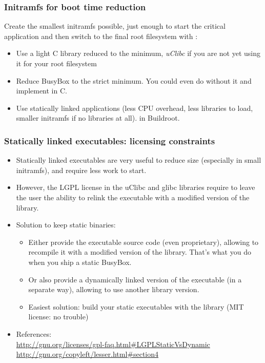 \begin{frame}
\frametitle{Initramfs for boot time reduction}
Create the smallest initramfs possible, just enough to start the critical
application and then switch to the final root filesystem with
:
\begin{itemize}
\item Use a light C library reduced to the minimum,
      {\em uClibc} if you are not yet using it for your root filesystem
\item Reduce BusyBox to the strict minimum.
      You could even do without it and implement  in C.
\item Use statically linked applications (less CPU overhead, less
      libraries to load, smaller initramfs if no libraries at all).
       in Buildroot.
\end{itemize}
\end{frame}

\begin{frame}
\frametitle{Statically linked executables: licensing constraints}
\begin{itemize}
\item Statically linked executables are very useful to reduce size
      (especially in small initramfs), and require less work to start.
\item However, the LGPL license in the uClibc and glibc libraries
      require to leave the user the ability to relink the executable
      with a modified version of the library.
\item Solution to keep static binaries:
      \begin{itemize}
      \item Either provide the executable source code (even
            proprietary), allowing to recompile it with a modified
            version of the library. That's what you do when
            you ship a static BusyBox.
      \item Or also provide a dynamically linked version of the
	    executable (in a separate way), allowing to use another
            library version.
      \item Easiest solution: build your static executables with the
	     library (MIT license: no trouble)
      \end{itemize}
\item References: \\
      {\footnotesize
      \url{http://gnu.org/licenses/gpl-faq.html\#LGPLStaticVsDynamic} \\
      \url{http://gnu.org/copyleft/lesser.html\#section4}
      }
\end{itemize}
\end{frame}

